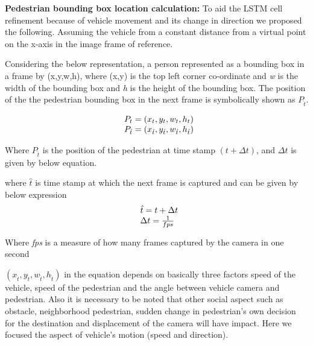 \newpara
\textbf{Pedestrian bounding box location calculation:}
To aid the LSTM cell refinement because of vehicle movement and its change in direction we proposed the following. Assuming the vehicle from a constant distance from a virtual point on the x-axis in the image frame of reference.

Considering the below representation, a person represented as a bounding box in a frame by (x,y,w,h), where (x,y) is the top left corner co-ordinate and \textit{w} is the width of the bounding box and \textit{h} is the height of the bounding box. The position of the the pedestrian bounding box in the next frame is symbolically shown as ${P}_{\hat{t}}$.

\begin{equation}
\begin{array}{l@{}}
{P}_{t}=(x_t,y_t,w_t,h_t) \\
{P}_{\hat{t}}=(x_{\hat{t}},y_{\hat{t}},w_{\hat{t}},h_{\hat{t}})
\end{array}
\end{equation}

Where ${P}_{\hat{t}}$ is the position of the pedestrian at time stamp $(t+\Delta t)$, and $\Delta t$ is given by below equation.

where $\hat{t}$ is time stamp at which the next frame is captured and can be given by below expression
\begin{equation} \label{delta-t}
\begin{array}{l@{}}
\hat{t} = t +  \Delta t \\
\Delta t = \frac{1}{fps}
\end{array}
\end{equation}


Where \textit{fps} is a measure of how many frames captured by the camera in one second

$(x_{\hat{t}},y_{\hat{t}},w_{\hat{t}},h_{\hat{t}})$ in the equation depends on basically three factors speed of the vehicle, speed of the pedestrian and the angle between vehicle camera and pedestrian. Also it is necessary to be noted that other social aspect such as obstacle, neighborhood pedestrian, sudden change in pedestrian's own decision for the destination and displacement of the camera will have impact.
Here we focused the aspect of vehicle's motion (speed and direction).



